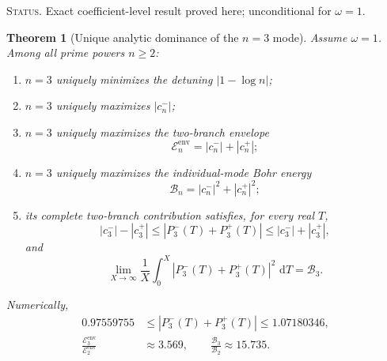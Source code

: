 \documentclass[11pt]{amsart}
\numberwithin{equation}{section}
\theoremstyle{plain}
\newtheorem{theorem}{Theorem}[section]
\theoremstyle{definition}
\theoremstyle{remark}
\newcommand{\1}{\mathbf{1}}
\newcommand{\dd}{\,\mathrm{d}}
\newcommand{\statusnote}[1]{%
  \par\smallskip\noindent
  \begingroup\footnotesize\textsc{Status.} #1\endgroup
  \par\smallskip}
\begin{document}
\statusnote{Exact coefficient-level result proved here; unconditional for $\omega=1$.}
\begin{theorem}[Unique analytic dominance of the \(n=3\) mode]
\label{thm:n3_analytic_dominance}
Assume $\omega=1$.  Among all prime powers $n\geq2$:
\begin{enumerate}[label=\textup{(\roman*)}]
\item $n=3$ uniquely minimizes the detuning $|1-\log n|$;
\item $n=3$ uniquely maximizes $|c_n^-|$;
\item $n=3$ uniquely maximizes the two-branch envelope
\begin{equation}
\mathscr E_n^{\mathrm{env}}=|c_n^-|+|c_n^+|;
\label{eq:n3_total_envelope}
\end{equation}
\item $n=3$ uniquely maximizes the individual-mode Bohr energy
\begin{equation}
\mathcal B_n=|c_n^-|^2+|c_n^+|^2;
\label{eq:n3_mode_bohr_energy_definition}
\end{equation}
\item its complete two-branch contribution satisfies, for every real $T$,
\begin{equation}
|c_3^-|-|c_3^+|
\leq
|P_3^-(T)+P_3^+(T)|
\leq
|c_3^-|+|c_3^+|,
\label{eq:n3_pointwise_annulus}
\end{equation}
and
\begin{equation}
\lim_{X\to\infty}\frac1X\int_0^X
|P_3^-(T)+P_3^+(T)|^2\,\dd T
=
\mathcal B_3.
\label{eq:n3_bohr_energy}
\end{equation}
\end{enumerate}
Numerically,
\begin{align}
0.97559755
&\leq
|P_3^-(T)+P_3^+(T)|
\leq
1.07180346,
\label{eq:n3_numerical_envelope}
\\
\frac{\mathscr E_3^{\mathrm{env}}}{\mathscr E_2^{\mathrm{env}}}
&\approx3.569,
\qquad
\frac{\mathcal B_3}{\mathcal B_2}
\approx15.735.
\label{eq:n3_ratios_to_n2}
\end{align}
\end{theorem}
\end{document}
